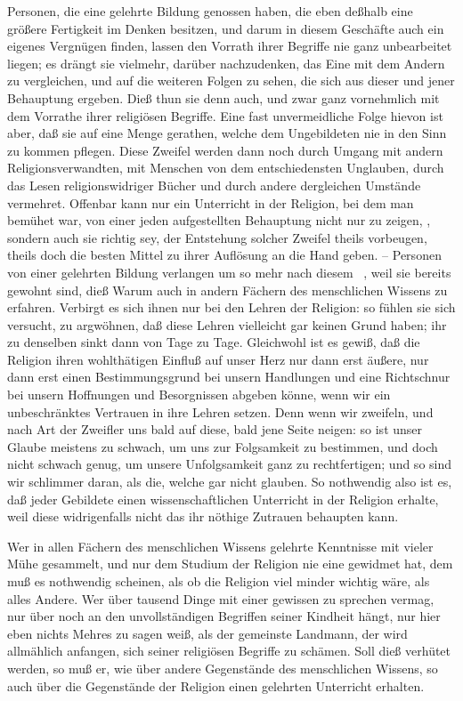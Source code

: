 \begin{aufza}
\begin{aufzb}
\item Personen, die eine gelehrte Bildung genossen haben, die eben deßhalb eine größere Fertigkeit im Denken besitzen, und darum in diesem Geschäfte auch ein eigenes Vergnügen finden, lassen den Vorrath ihrer Begriffe nie ganz unbearbeitet liegen; es drängt sie vielmehr, darüber nachzudenken, das Eine mit dem Andern zu vergleichen, und auf die weiteren Folgen zu sehen, die sich aus dieser und jener Behauptung ergeben. Dieß thun sie denn auch, und zwar ganz vornehmlich mit dem Vorrathe ihrer religiösen Begriffe. Eine fast unvermeidliche Folge hievon ist aber, daß sie auf eine Menge  gerathen, welche dem Ungebildeten nie in den Sinn zu kommen pflegen. Diese Zweifel werden dann noch durch Umgang mit andern Religionsverwandten, mit Menschen von dem entschiedensten Unglauben, durch das Lesen religionswidriger Bücher und durch andere dergleichen Umstände vermehret. Offenbar kann nur ein  Unterricht in der Religion, bei dem man bemühet war, von einer jeden aufgestellten Behauptung nicht nur zu zeigen, , sondern auch  sie richtig sey, der Entstehung solcher Zweifel theils vorbeugen, theils doch die besten Mittel zu ihrer Auflösung an die Hand geben. -- Personen von einer gelehrten Bildung verlangen um so mehr nach diesem~ , weil sie bereits gewohnt sind, dieß Warum auch in andern Fächern des menschlichen Wissens zu erfahren. Verbirgt es sich ihnen nur bei den Lehren der Religion: so fühlen sie sich versucht, zu argwöhnen, daß diese Lehren vielleicht gar keinen Grund haben; ihr  zu denselben sinkt dann von Tage zu Tage. Gleichwohl ist es gewiß, daß die Religion ihren wohlthätigen Einfluß auf unser Herz nur dann erst äußere, nur dann erst einen Bestimmungsgrund bei unsern Handlungen und eine Richtschnur bei unsern Hoffnungen und Besorgnissen abgeben könne, wenn wir ein unbeschränktes Vertrauen in ihre Lehren setzen. Denn wenn wir zweifeln, und nach Art der Zweifler uns bald auf diese, bald jene Seite neigen: so ist unser Glaube meistens zu schwach, um uns zur Folgsamkeit zu bestimmen, und doch nicht schwach genug, um unsere Unfolgsamkeit ganz zu rechtfertigen; und so sind wir schlimmer daran, als die, welche gar nicht glauben. So nothwendig also ist es, daß jeder Gebildete einen wissenschaftlichen Unterricht in der Religion erhalte, weil diese widrigenfalls nicht das ihr nöthige Zutrauen behaupten kann. 
\item Wer in allen Fächern des menschlichen Wissens gelehrte Kenntnisse mit vieler Mühe gesammelt, und nur dem Studium der Religion nie eine  gewidmet hat, dem muß es nothwendig scheinen, als ob die Religion viel minder wichtig wäre, als alles Andere. Wer über tausend Dinge mit einer gewissen  zu sprechen vermag, nur über  noch an den unvollständigen Begriffen seiner Kindheit hängt, nur hier eben nichts Mehres zu sagen weiß, als der gemeinste Landmann, der wird allmählich anfangen, sich seiner religiösen Begriffe zu schämen. Soll dieß verhütet werden, so muß er, wie über andere Gegenstände des menschlichen Wissens, so auch über die Gegenstände der Religion einen gelehrten Unterricht erhalten.

\end{aufzb}
\end{aufza}

